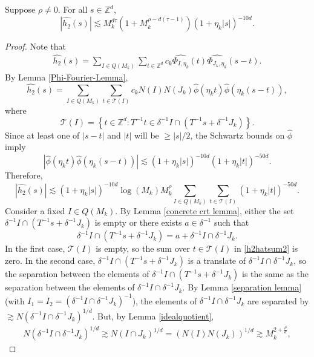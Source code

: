 \documentclass[10pt,a4paper]{amsart}
\def\ZZ{\mathbb{Z}}
\newcommand{\cbr}[1]{ \left\{ {#1} \right\} }
\begin{document}
\begin{lemma}\label{h_2_est}
Suppose $\rho \neq 0$. 
For all 
$s \in \ZZ^d$, 
$$
|\widehat{h_2}(s)| \lesssim  M_k^{d\tau} (1+ M_k^{\rho -d(\tau-1)})(1 + \eta_k |s|)^{-10d}.
$$
\end{lemma}

\begin{proof}
Note that
\begin{align*}
\widehat{h_2}(s) 
= \sum_{I \in Q(M_k)} \sum_{t \in \mathbb{Z}^d} 
c_k \widehat{\Phi_{I, \eta_k}}(t) \widehat{\Phi_{J_k, \eta_k}}(s - t).
\end{align*}
By Lemma \ref{Phi-Fourier-Lemma}, 
\[\widehat{h_2}(s) = \sum_{I \in Q(M_k)} \sum_{t \in \mathcal{T}(I)} 
c_k 
N(I) 
 N(J_k) 
 \widehat \phi(\eta_k t)
\widehat \phi(\eta_k(s - t)),\]
where 
$$
\mathcal{T}(I)
=
\cbr{t \in \ZZ^d : T^{-1}t \in \delta^{-1}I \cap (T^{-1}s + \delta^{-1}J_k)}.
$$
Since at least one of $|s - t|$ and $|t|$ will be $\geq |s|/2$, 
the Schwartz bounds on $\widehat{\phi}$ 
imply 
$$
|\widehat \phi(\eta_k t)
\widehat \phi(\eta_k(s - t))| 
\lesssim (1+\eta_k|s|)^{-10d}(1+\eta_k|t|)^{-50d}.
$$
Therefore,
\begin{equation}\label{h2hatsum2}
|\widehat{h_2}(s)| \lesssim 
(1 + \eta_k |s|)^{-10d} \log (M_k) M_k^{\rho} 
\sum_{I \in Q(M_k)} 
\sum_{t \in \mathcal{T}(I)} 
(1+\eta_k|t|)^{-50d}. 
\end{equation}
Consider a fixed $I \in Q(M_k)$. 
By Lemma \ref{concrete crt lemma},  either the set 
$\delta^{-1} I \cap (T^{-1} s + \delta^{-1} J_k)$ is empty or 
there exists $a \in \delta^{-1}$ such that 
$$
\delta^{-1} I \cap (T^{-1} s + \delta^{-1} J_k)
=
a + \delta^{-1} I \cap \delta^{-1}J_k. 
$$ 
In the first case, $\mathcal{T}(I)$ is empty, so the sum over $t \in \mathcal{T}(I)$ in \eqref{h2hatsum2} is zero. 
In the second case, 
$\delta^{-1} I \cap (T^{-1} s + \delta^{-1} J_k)$ is a translate of 
$\delta^{-1} I \cap \delta^{-1}J_k$, 
so the separation between the elements of $\delta^{-1} I \cap (T^{-1} s + \delta^{-1} J_k)$
 is the same as the separation between the elements of $\delta^{-1} I \cap \delta^{-1}J_k$. 
By Lemma \ref{separation lemma} (with $I_1 = I_2 = ( \delta^{-1} I \cap \delta^{-1}J_k )^{-1}$), the elements of $\delta^{-1} I \cap \delta^{-1}J_k$ are separated by 
$
\gtrsim 
N(\delta^{-1} I \cap \delta^{-1}J_k)^{1/d}.
$ 
But, by Lemma \ref{idealquotient}, 
\begin{align}\label{I Jk norm calc}
N(\delta^{-1} I \cap \delta^{-1}J_k)^{1/d}
\gtrsim  
N(I \cap J_k)^{1/d}
=(N(I) N(J_k))^{1/d}
\gtrsim 
M_k^{2+\frac{\rho}{d}}, 

\end{align}
\end{proof}
\end{document}
